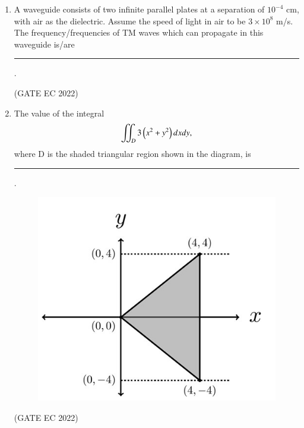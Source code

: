 \documentclass[journal,12pt,onecolumn]{IEEEtran}
\theoremstyle{remark}
\begin{document}
\begin{enumerate}
    \item A waveguide consists of two infinite parallel plates  at a separation of $10^{-4}$ cm, with air as the dielectric. Assume the speed of light in air to be $3 \times 10^8$ m/s. The frequency/frequencies of TM waves which can propagate in this waveguide is/are \rule{2cm}{0.4pt}.
    
    \hfill{(GATE EC 2022)}
    \begin{enumerate}
    \end{enumerate}

    \item The value of the integral
    \begin{align*}
    \iint_D 3\left(x^2+y^2\right)dxdy, 
    \end{align*}
    where D is the shaded triangular region shown in the diagram,  is \rule{2cm}{0.4pt} .
    \begin{figure}[H]
        \centering
        \includegraphics[width=0.5\columnwidth]{figs/m25.jpg}
        \caption*{}
        \label{fig:m25}
    \end{figure}
    
    \hfill{(GATE EC 2022)}


\end{enumerate}
\end{document}
